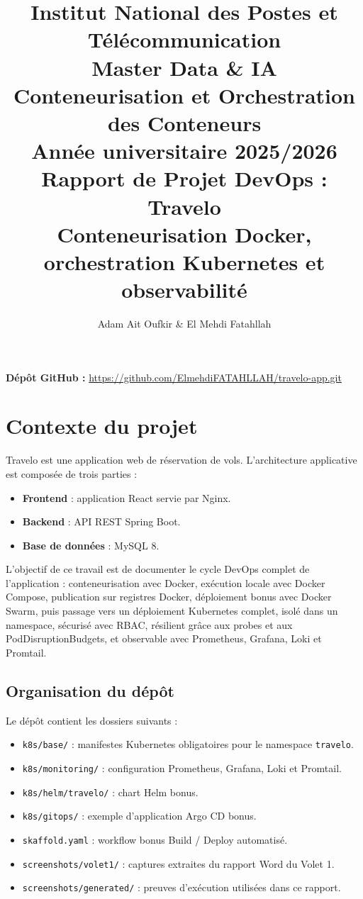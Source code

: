 \documentclass[11pt,a4paper]{article}
\title{
    \normalsize Institut National des Postes et Télécommunication \\
    Master Data \& IA \\
    Conteneurisation et Orchestration des Conteneurs \\
    Année universitaire 2025/2026 \\
    \vspace{1.5cm}
    \Huge \textbf{Rapport de Projet DevOps : Travelo} \\
    \Large Conteneurisation Docker, orchestration Kubernetes et observabilité
}
\author{Adam Ait Oufkir \& El Mehdi Fatahllah}
\date{}
\begin{document}
\maketitle
\thispagestyle{empty}
\vfill
\noindent\textbf{Dépôt GitHub :} \url{https://github.com/ElmehdiFATAHLLAH/travelo-app.git}
\newpage

\tableofcontents
\newpage

\section{Contexte du projet}

Travelo est une application web de réservation de vols. L'architecture applicative est composée de trois parties :
\begin{itemize}
    \item \textbf{Frontend} : application React servie par Nginx.
    \item \textbf{Backend} : API REST Spring Boot.
    \item \textbf{Base de données} : MySQL 8.
\end{itemize}

L'objectif de ce travail est de documenter le cycle DevOps complet de l'application : conteneurisation avec Docker, exécution locale avec Docker Compose, publication sur registres Docker, déploiement bonus avec Docker Swarm, puis passage vers un déploiement Kubernetes complet, isolé dans un namespace, sécurisé avec RBAC, résilient grâce aux probes et aux PodDisruptionBudgets, et observable avec Prometheus, Grafana, Loki et Promtail.

\subsection{Organisation du dépôt}

Le dépôt contient les dossiers suivants :
\begin{itemize}
    \item \texttt{k8s/base/} : manifestes Kubernetes obligatoires pour le namespace \texttt{travelo}.
    \item \texttt{k8s/monitoring/} : configuration Prometheus, Grafana, Loki et Promtail.
    \item \texttt{k8s/helm/travelo/} : chart Helm bonus.
    \item \texttt{k8s/gitops/} : exemple d'application Argo CD bonus.
    \item \texttt{skaffold.yaml} : workflow bonus Build / Deploy automatisé.
    \item \texttt{screenshots/volet1/} : captures extraites du rapport Word du Volet 1.
    \item \texttt{screenshots/generated/} : preuves d'exécution utilisées dans ce rapport.
\end{itemize}
\end{document}
